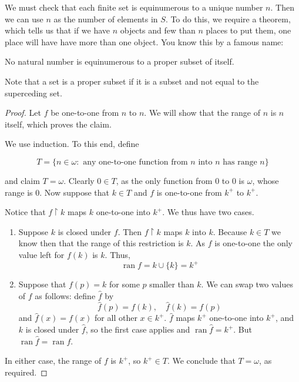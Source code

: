 We must check that each finite set is equinumerous to a unique number $n$. Then we can use $n$ as the number of elements in $S$. To do this, we require a theorem, which tells us that if we have $n$ objects and few than $n$ places to put them, one place will have have more than one object. You know this by a famous name:

\begin{theorem}
    No natural number is equinumerous to a proper subset of itself.
\end{theorem}

Note that a set is a proper subset if it is a subset and not equal to the superceding set.

\begin{proof}
    Let $f$ be one-to-one from $n$ to $n$. We will show that the range of $n$ is $n$ itself, which proves the claim. 

    We use induction. To this end, define

    \[T = \{n \in \omega : \text{ any one-to-one function from $n$ into $n$ has range $n$}\}\]

    and claim $T = \omega$. Clearly $0 \in T$, as the only function from 0 to 0 is $\omega$, whose range is $0$. Now suppose that $k \in T$ and $f$ is one-to-one from $k^+$ to $k^+$. 

    Notice that $f \upharpoonright k$ maps $k$ one-to-one into $k^+$. We thus have two cases. 

    \begin{enumerate}
        \item Suppose $k$ is closed under $f$. Then $f \upharpoonright k$ maps $k$ into $k$. Because $k \in T$ we know then that the range of this restriction is $k$. As $f$ is one-to-one the only value left for $f(k)$ is $k$. Thus, 
        \[\operatorname{ran} f = k \cup \{k\} = k^+\]


        \item Suppose that $f(p) = k$ for some $p$ smaller than $k$. We can swap two values of $f$ as follows: define $\hat{f}$ by 
        \[\hat{f}(p) = f(k), \quad \hat{f}(k) = f(p)\]
        and $\hat{f}(x) = f(x)$ for all other $x \in k^+$. $\hat{f}$ maps $k^+$ one-to-one into $k^+$, and $k$ is closed under $\hat{f}$, so the first case applies and $\operatorname{ran} \hat{f} = k^+$. But $\operatorname{ran}\hat{f} = \operatorname{ran}f$. 
    \end{enumerate}

    In either case, the range of $f$ is $k^+$, so $k^+ \in T$. We conclude that $T = \omega$, as required.
\end{proof}

